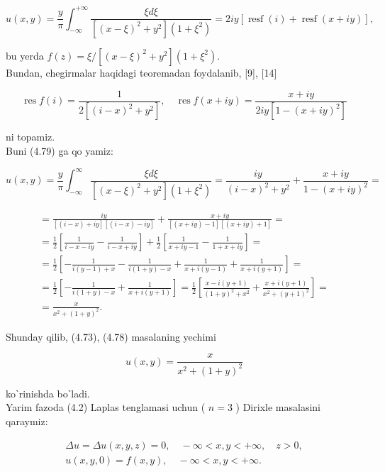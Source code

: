 \documentclass[10pt]{article}
\begin{document}
\begin{equation*}
u(x, y)=\frac{y}{\pi} \int_{-\infty}^{+\infty} \frac{\xi d \xi}{\left[(x-\xi)^{2}+y^{2}\right]\left(1+\xi^{2}\right)}=2 i y[\operatorname{resf}(i)+\operatorname{resf}(x+i y)], \tag{4.79}
\end{equation*}


bu yerda $f(z)=\xi /\left[(x-\xi)^{2}+y^{2}\right]\left(1+\xi^{2}\right)$.\\[0pt]
Bundan, chegirmalar haqidagi teoremadan foydalanib, [9], [14]


\begin{equation*}
\operatorname{res} f(i)=\frac{1}{2\left[(i-x)^{2}+y^{2}\right]}, \quad \operatorname{res} f(x+i y)=\frac{x+i y}{2 i y\left[1-(x+i y)^{2}\right]} \tag{4,80}
\end{equation*}


ni topamiz.\\
Buni (4.79) ga qo yamiz:

$$
u(x, y)=\frac{y}{\pi} \int_{-\infty}^{\infty} \frac{\xi d \xi}{\left[(x-\xi)^{2}+y^{2}\right]\left(1+\xi^{2}\right)}=\frac{i y}{(i-x)^{2}+y^{2}}+\frac{x+i y}{1-(x+i y)^{2}}=
$$

$$
\begin{gathered}
=\frac{i y}{[(i-x)+i y][(i-x)-i y]}+\frac{x+i y}{[(x+i y)-1][(x+i y)+1]}= \\
=\frac{1}{2}\left[\frac{1}{i-x-i y}-\frac{1}{i-x+i y}\right]+\frac{1}{2}\left[\frac{1}{x+i y-1}-\frac{1}{1+x+i y}\right]= \\
=\frac{1}{2}\left[-\frac{1}{i(y-1)+x}-\frac{1}{i(1+y)-x}+\frac{1}{x+i(y-1)}+\frac{1}{x+i(y+1)}\right]= \\
=\frac{1}{2}\left[-\frac{1}{i(1+y)-x}+\frac{1}{x+i(y+1)}\right]=\frac{1}{2}\left[\frac{x-i(y+1)}{(1+y)^{2}+x^{2}}+\frac{x+i(y+1)}{x^{2}+(y+1)^{2}}\right]= \\
=\frac{x}{x^{2}+(1+y)^{2}} .
\end{gathered}
$$

Shunday qilib, (4.73), (4.78) masalaning yechimi

$$
u(x, y)=\frac{x}{x^{2}+(1+y)^{2}}
$$

koˋrinishda boˋladi.\\
Yarim fazoda (4.2) Laplas tenglamasi uchun ( $n=3$ ) Dirixle masalasini qaraymiz:

$$
\begin{gathered}
\Delta u=\Delta u(x, y, z)=0, \quad-\infty<x, y<+\infty, \quad z>0, \\
u(x, y, 0)=f(x, y), \quad-\infty<x, y<+\infty .
\end{gathered}
$$
\end{document}
